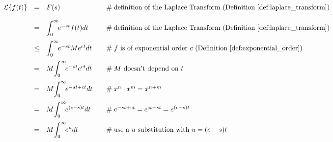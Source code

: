 \documentclass{article}
\theoremstyle{definition}
\begin{document}
\begin{equation*}
\begin{array}{lllll}
\mathcal{L}\{f(t)\}
&=& F(s)                                                                            &\quad  \mathrel{\#} \text{definition of the Laplace Transform (Definition \ref{def:laplace_transform})}                                                \\  
[12pt]                                                                                 %
&=&   \mathlarger{\int}_0^\infty \! e^{-st} f(t) dt                  &\quad  \mathrel{\#} \text{definition of the Laplace Transform (Definition \ref{def:laplace_transform})}                                                \\  
[12pt]                                                                                 %
&\leq& \mathlarger{\int}_0^\infty \! e^{-st}  Me^{ct}dt         &\quad  \mathrel{\#} \text{$f$ is of exponential order $c$ (Definition \ref{def:exponential_order})}                                                      \\  
[12pt]                                                                                 %
&=& M \mathlarger{\int}_0^\infty \! e^{-st} e^{ct} dt           &\quad  \mathrel{\#} \text{$M$ doesn't depend on $t$}                                                                                                                          \\   
[12pt]                                                                                %
&=& M \mathlarger{\int}_0^\infty \! e^{-st + ct}  dt             &\quad  \mathrel{\#} \text{$x^n \cdot x^m = x^{n+m}$}                                                                                                                           \\      
[12pt]                                                                                 %
&=& M \mathlarger{\int}_0^\infty\! e^{(c-s)t}  dt                 &\quad  \mathrel{\#}  e^{-st + ct} = e^{ct -st} = e^{(c-s)t}                                                                                                                        \\      
[12pt]                                                                                 %
&=&  M \mathlarger{\int}_0^\infty \! e^u dt                         &\quad  \mathrel{\#} \text{use a $u$ substitution with $u = (c-s)t$}                                                                                                       \\     

\end{array}
\end{equation*}
\end{document}
